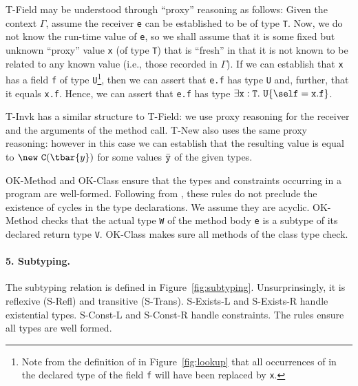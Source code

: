 {\sc T-Field} may be understood through ``proxy'' reasoning as
follows:  Given the context $\Gamma$, assume the receiver {\tt e} can
be established to be of type {\tt T}. Now, we do not know the run-time
value of {\tt e}, so we shall assume that it is some fixed but unknown
``proxy'' value {\tt x} (of type {\tt T}) that is ``fresh'' in that it
is not known to be related to any known value (i.e., those recorded
in $\Gamma$).  If we can establish that {\tt x} has a field {\tt f} of
type {\tt U}\footnote{Note from the definition of
\fields{} in Figure~\ref{fig:lookup} that all occurrences of
\this{} in the declared type of the field {\tt f} will have been replaced
by {\tt x}.}, then we can assert that
{\tt e.f} has type {\tt U} and, further, that it equals {\tt x.f}.
Hence, we can assert that {\tt e.f} has type 
$\exists {\tt x}:{\tt T}.~{\tt U}\{\self={\tt x}.{\tt f}\}$.

{\sc T-Invk} has a similar structure to {\sc T-Field}: we use
proxy reasoning for the receiver and the arguments of the method
call. {\sc T-New} also uses the same proxy reasoning: however in this case
we can establish that the resulting value is equal to $\new~{\tt C}(\tbar{y})$
for some values $\bar{\tt y}$ of the given types.

{\sc OK-Method} and {\sc OK-Class} ensure that the types and constraints occurring in a program are well-formed. Following from \FJ{}, these rules do not preclude the existence of cycles in the type declarations. We assume they are acyclic. {\sc OK-Method} checks that the actual type {\tt W} of the method body {\tt e} is a subtype of its declared return type {\tt V}. {\sc OK-Class} makes sure all methods of the class type check.


\paragraph{5. Subtyping.} The subtyping relation is defined in Figure~\ref{fig:subtyping}.
Unsurprinsingly, it is reflexive ({\sc S-Refl}) and transitive ({\sc S-Trans}).
{\sc S-Exists-L} and {\sc S-Exists-R} handle existential types.
{\sc S-Const-L} and {\sc S-Const-R} handle constraints. The rules ensure all types are well formed.

